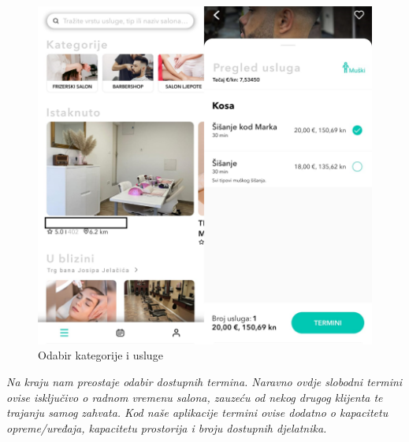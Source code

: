 		\begin{figure}[H]
			\includegraphics[scale=0.6]{slike/Buker-odabir.PNG} %
			\centering
			\caption{Odabir kategorije i usluge}
			\label{fig:promjene}
		\end{figure}
		
		\textit{Na kraju nam preostaje odabir dostupnih termina. Naravno ovdje slobodni termini ovise isključivo o radnom vremenu salona, zauzeću od nekog drugog klijenta te trajanju samog zahvata. Kod naše aplikacije termini ovise dodatno o kapacitetu opreme/uređaja, kapacitetu prostorija i broju dostupnih djelatnika.}
		
